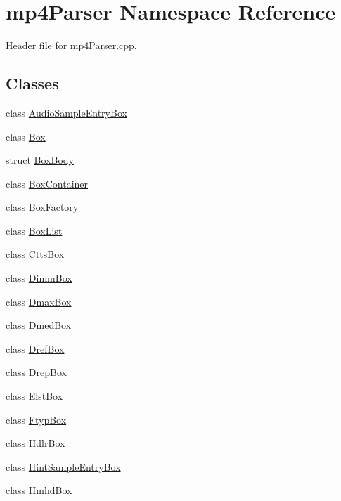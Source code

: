 \hypertarget{namespacemp4_parser}{}\section{mp4\+Parser Namespace Reference}
\label{namespacemp4_parser}


Header file for mp4\+Parser.\+cpp.  


\subsection*{Classes}
\begin{DoxyCompactItemize}
\item 
class \mbox{\hyperlink{classmp4_parser_1_1_audio_sample_entry_box}{Audio\+Sample\+Entry\+Box}}
\item 
class \mbox{\hyperlink{classmp4_parser_1_1_box}{Box}}
\item 
struct \mbox{\hyperlink{structmp4_parser_1_1_box_body}{Box\+Body}}
\item 
class \mbox{\hyperlink{classmp4_parser_1_1_box_container}{Box\+Container}}
\item 
class \mbox{\hyperlink{classmp4_parser_1_1_box_factory}{Box\+Factory}}
\item 
class \mbox{\hyperlink{classmp4_parser_1_1_box_list}{Box\+List}}
\item 
class \mbox{\hyperlink{classmp4_parser_1_1_ctts_box}{Ctts\+Box}}
\item 
class \mbox{\hyperlink{classmp4_parser_1_1_dimm_box}{Dimm\+Box}}
\item 
class \mbox{\hyperlink{classmp4_parser_1_1_dmax_box}{Dmax\+Box}}
\item 
class \mbox{\hyperlink{classmp4_parser_1_1_dmed_box}{Dmed\+Box}}
\item 
class \mbox{\hyperlink{classmp4_parser_1_1_dref_box}{Dref\+Box}}
\item 
class \mbox{\hyperlink{classmp4_parser_1_1_drep_box}{Drep\+Box}}
\item 
class \mbox{\hyperlink{classmp4_parser_1_1_elst_box}{Elst\+Box}}
\item 
class \mbox{\hyperlink{classmp4_parser_1_1_ftyp_box}{Ftyp\+Box}}
\item 
class \mbox{\hyperlink{classmp4_parser_1_1_hdlr_box}{Hdlr\+Box}}
\item 
class \mbox{\hyperlink{classmp4_parser_1_1_hint_sample_entry_box}{Hint\+Sample\+Entry\+Box}}
\item 
class \mbox{\hyperlink{classmp4_parser_1_1_hmhd_box}{Hmhd\+Box}}

\end{DoxyCompactItemize}
